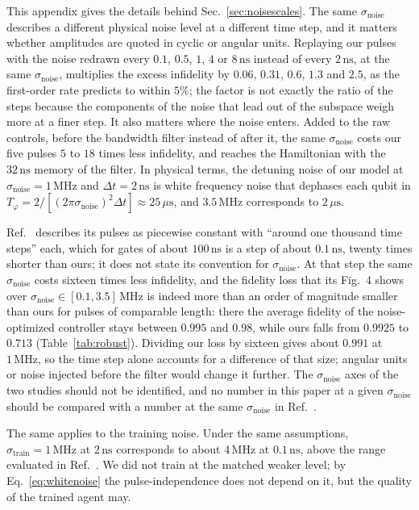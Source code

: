 \documentclass[aps,prx,twocolumn,superscriptaddress,nofootinbib,amsmath,amssymb,floatfix]{revtex4-2}
\newcommand{\snoise}{\sigma_{\mathrm{noise}}}
\newcommand{\strain}{\sigma_{\mathrm{train}}}
\newcommand{\ns}{\,\mathrm{ns}}
\newcommand{\MHz}{\,\mathrm{MHz}}
\begin{document}
This appendix gives the details behind Sec.~\ref{sec:noisescales}. The same $\snoise$ describes a different physical
noise level at a different time step, and it matters whether amplitudes are quoted in cyclic or angular
units. Replaying our pulses with the noise redrawn every $0.1$, $0.5$, $1$, $4$ or $8\ns$ instead of
every $2\ns$, at the same $\snoise$, multiplies the excess infidelity by $0.06$, $0.31$, $0.6$, $1.3$ and
$2.5$, as the first-order rate predicts to within $5\%$; the factor is not exactly the ratio of the steps
because the components of the noise that lead out of the subspace weigh more at a finer step. It also matters where the noise enters. Added to the raw controls,
before the bandwidth filter instead of after it, the same $\snoise$ costs our five pulses $5$ to $18$ times
less infidelity, and reaches the Hamiltonian with the $32\ns$ memory of the filter. In physical terms, the
detuning noise of our model at $\snoise=1\MHz$ and $\Delta t=2\ns$ is white frequency noise that dephases
each qubit in $T_\varphi=2/[(2\pi\snoise)^2\Delta t]\approx25\,\mu\mathrm{s}$, and $3.5\MHz$ corresponds to
$2\,\mu\mathrm{s}$.

Ref.~\cite{Niu2019} describes its pulses as piecewise constant with ``around one thousand time steps''
each, which for gates of about $100\ns$ is a step of about $0.1\ns$, twenty times shorter than ours; it
does not state its convention for $\snoise$. At that step the same $\snoise$ costs sixteen times less
infidelity, and the fidelity loss that its Fig.~4 shows over $\snoise\in[0.1,3.5]\MHz$ is indeed more
than an order of magnitude smaller than ours for pulses of comparable length: there the average fidelity
of the noise-optimized controller stays between $0.995$ and $0.98$, while ours falls from $0.9925$ to
$0.713$ (Table~\ref{tab:robust}). Dividing our loss by sixteen gives about $0.991$ at $1\MHz$, so the time
step alone accounts for a difference of that size; angular units or noise injected before the filter would
change it further. The $\snoise$ axes of the two studies should not be identified, and no number in this
paper at a given $\snoise$ should be compared with a number at the same $\snoise$ in Ref.~\cite{Niu2019}.

The same applies to the training noise. Under the same assumptions, $\strain=1\MHz$ at $2\ns$ corresponds
to about $4\MHz$ at $0.1\ns$, above the range evaluated in Ref.~\cite{Niu2019}. We did not train at the
matched weaker level; by Eq.~\eqref{eq:whitenoise} the pulse-independence does not depend on it, but the
quality of the trained agent may.



\end{document}
